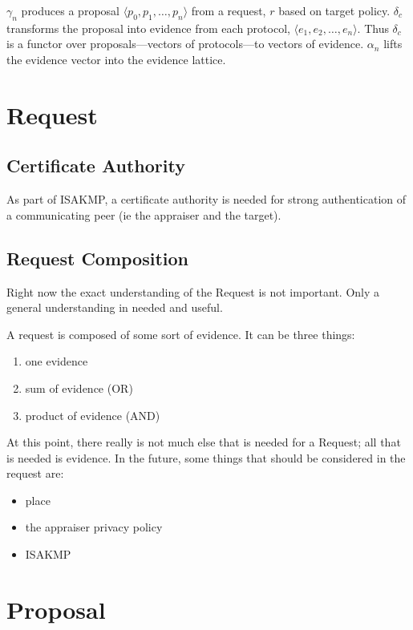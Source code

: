 \documentclass[10pt]{report}
\newcommand{\squash}{\itemsep=0pt\parskip=0pt}
\begin{document}
$\gamma_n$ produces a proposal $\langle p_0,p_1,\ldots,p_n\rangle$
from a request, $r$ based on target policy. $\delta_c$
transforms the proposal into evidence from each protocol,
$\langle e_1,e_2,\ldots,e_n \rangle$. Thus $\delta_c$ is a functor
over proposals---vectors of protocols---to vectors of evidence.
$\alpha_n$ lifts the evidence vector into the evidence lattice.

\section {Request}

\subsection {Certificate Authority}
  
  As part of ISAKMP, a certificate authority is needed for strong 
  authentication of a communicating peer (ie the appraiser and the
  target). 

\subsection {Request Composition}
  
  Right now the exact understanding of the Request is not important.
  Only a general understanding in needed and useful. 
  
  A request is composed of some sort of evidence. It can be three things:
  \begin{enumerate}
  \squash
  \item one evidence
  \item sum of evidence (OR)
  \item product of evidence (AND)
  \end{enumerate}

  
  At this point, there really is not much else that is needed for a Request; all that is needed is evidence. In the future, some things that should be considered in the request are:
  
  \begin{itemize}
   \squash
   \item place
   \item the appraiser privacy policy
   \item ISAKMP
  \end{itemize}

\section {Proposal}
\end{document}
